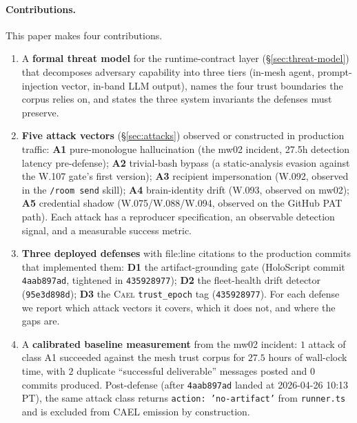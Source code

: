 \documentclass[letterpaper,twocolumn,10pt]{article}
\newcommand{\cael}{\textsc{Cael}}
\newcommand{\holoscript}{HoloScript}
\newcommand{\trustepoch}{\texttt{trust\_epoch}}
\begin{document}
\paragraph{Contributions.} This paper makes four contributions.
\begin{enumerate}[topsep=2pt,itemsep=1pt]
\item A \textbf{formal threat model} for the runtime-contract layer
(\S\ref{sec:threat-model}) that decomposes adversary capability into
three tiers (in-mesh agent, prompt-injection vector, in-band LLM
output), names the four trust boundaries the corpus relies on, and
states the three system invariants the defenses must preserve.
\item \textbf{Five attack vectors} (\S\ref{sec:attacks}) observed or
constructed in production traffic: \textbf{A1} pure-monologue
hallucination (the mw02 incident, 27.5h detection latency pre-defense);
\textbf{A2} trivial-bash bypass (a static-analysis evasion against the
W.107 gate's first version); \textbf{A3} recipient impersonation
(W.092, observed in the \texttt{/room send} skill); \textbf{A4}
brain-identity drift (W.093, observed on mw02); \textbf{A5} credential
shadow (W.075/W.088/W.094, observed on the GitHub PAT path). Each
attack has a reproducer specification, an observable detection signal,
and a measurable success metric.
\item \textbf{Three deployed defenses} with file:line citations to the
production commits that implemented them: \textbf{D1} the
artifact-grounding gate (\holoscript{} commit \texttt{4aab897ad},
tightened in \texttt{435928977}); \textbf{D2} the fleet-health drift
detector (\texttt{95e3d898d}); \textbf{D3} the \cael{} \trustepoch{}
tag (\texttt{435928977}). For each defense we report which attack
vectors it covers, which it does not, and where the gaps are.
\item A \textbf{calibrated baseline measurement} from the mw02
incident: $1$ attack of class A1 succeeded against the mesh trust
corpus for $27.5$ hours of wall-clock time, with $2$ duplicate
``successful deliverable'' messages posted and $0$ commits produced.
Post-defense (after \texttt{4aab897ad} landed at 2026-04-26 10:13 PT),
the same attack class returns \texttt{action: 'no-artifact'} from
\texttt{runner.ts} and is excluded from CAEL emission by construction.
\end{enumerate}
\end{document}
